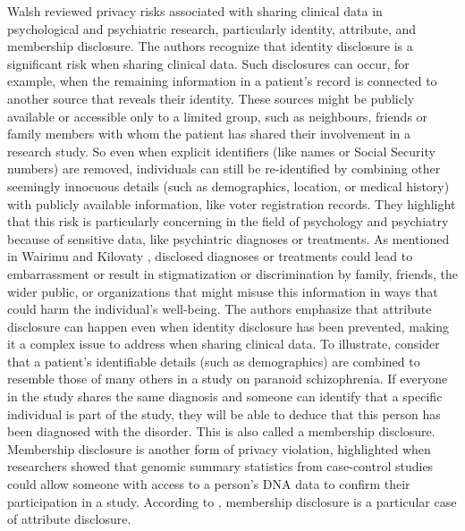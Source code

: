 \documentclass{article}
\begin{document}
Walsh \cite{2018_Walsh} reviewed privacy risks associated with sharing clinical data in psychological and psychiatric research, particularly identity, attribute, and membership disclosure. The authors recognize that identity disclosure is a significant risk when sharing clinical data. Such disclosures can occur, for example, when the remaining information in a patient's record is connected to another source that reveals their identity. These sources might be publicly available or accessible only to a limited group, such as neighbours, friends or family members with whom the patient has shared their involvement in a research study. So even when explicit identifiers (like names or Social Security numbers) are removed, individuals can still be re-identified by combining other seemingly innocuous details (such as demographics, location, or medical history) with publicly available information, like voter registration records.
They highlight that this risk is particularly concerning in the field of psychology and psychiatry because of sensitive data, like psychiatric diagnoses or treatments. 
As mentioned in Wairimu \cite{2022_Wairimu} and Kilovaty \cite{2021_Kilovaty}, disclosed diagnoses or treatments could lead to embarrassment or result in stigmatization or discrimination by family, friends, the wider public, or organizations that might misuse this information in ways that could harm the individual’s well-being.
The authors emphasize that attribute disclosure can happen even when identity disclosure has been prevented, making it a complex issue to address when sharing clinical data. To illustrate, consider that a patient's identifiable details (such as demographics) are combined to resemble those of many others in a study on paranoid schizophrenia. If everyone in the study shares the same diagnosis and someone can identify that a specific individual is part of the study, they will be able to deduce that this person has been diagnosed with the disorder. This is also called a membership disclosure.
Membership disclosure is another form of privacy violation, highlighted when researchers showed that genomic summary statistics from case-control studies could allow someone with access to a person's DNA data to confirm their participation in a study. According to \cite{2017_Templ}, membership disclosure is a particular case of attribute disclosure.




\end{document}
